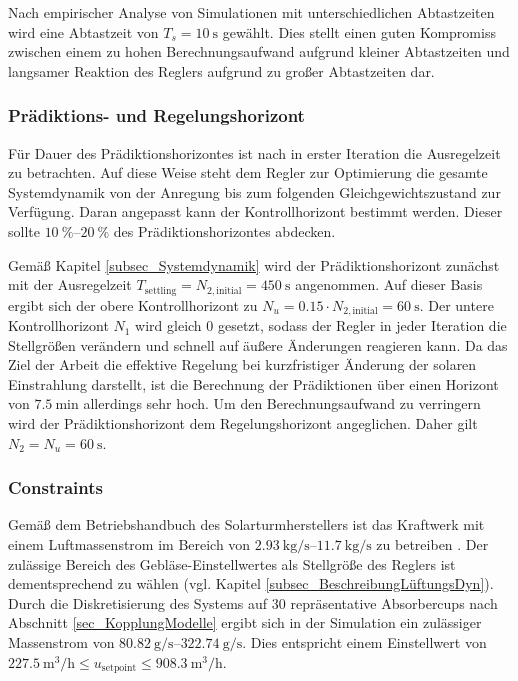 Nach empirischer Analyse von Simulationen mit unterschiedlichen Abtastzeiten wird eine Abtastzeit von $T_s=\SI{10}{\second}$ gewählt.
Dies stellt einen guten Kompromiss zwischen einem zu hohen Berechnungsaufwand aufgrund kleiner Abtastzeiten und langsamer Reaktion des Reglers aufgrund zu großer Abtastzeiten dar.


\subsubsection*{Prädiktions- und Regelungshorizont} \label{subsubsec_horizonte}
Für Dauer des Prädiktionshorizontes ist nach \cite{Bemporad} in erster Iteration die Ausregelzeit zu betrachten.
Auf diese Weise steht dem Regler zur Optimierung die gesamte Systemdynamik von der Anregung bis zum folgenden Gleichgewichtszustand zur Verfügung.
Daran angepasst kann der Kontrollhorizont bestimmt werden.
Dieser sollte $\SIrange{10}{20}{\percent}$ des Prädiktionshorizontes abdecken.

Gemäß Kapitel \ref{subsec_Systemdynamik} wird der Prädiktionshorizont zunächst mit der Ausregelzeit $T_{\mathrm{settling}} = N_{2,\mathrm{initial}} = \SI{450}{\second}$ angenommen.
Auf dieser Basis ergibt sich der obere Kontrollhorizont zu $N_u = 0.15\cdot N_{2,\mathrm{initial}} = \SI{60}{\second}$.
Der untere Kontrollhorizont $N_1$ wird gleich $0$ gesetzt, sodass der Regler in jeder Iteration die Stellgrößen verändern und schnell auf äußere Änderungen reagieren kann.
Da das Ziel der Arbeit die effektive Regelung bei kurzfristiger Änderung der solaren Einstrahlung darstellt, ist die Berechnung der Prädiktionen über einen Horizont von $\SI{7.5}{\minute}$ allerdings sehr hoch.
Um den Berechnungsaufwand zu verringern wird der Prädiktionshorizont dem Regelungshorizont angeglichen.
Daher gilt $N_2 = N_u = \SI{60}{\second}$.

\subsubsection*{Constraints} \label{subsubsec_constraints}
Gemäß dem Betriebshandbuch des Solarturmherstellers ist das Kraftwerk mit einem Luftmassenstrom im Bereich von $\SIrange{2.93}{11.7}{\kilo\gram\per\second}$ zu betreiben \cite[S.28]{HandbuchJülich}.
Der zulässige Bereich des Gebläse-Einstellwertes als Stellgröße des Reglers ist dementsprechend zu wählen (vgl. Kapitel \ref{subsec_BeschreibungLüftungsDyn}).
Durch die Diskretisierung des Systems auf 30 repräsentative Absorbercups nach Abschnitt \ref{sec_KopplungModelle} ergibt sich in der Simulation ein zulässiger Massenstrom von $\SIrange{80.82}{322.74}{\gram\per\second}$.
Dies entspricht einem Einstellwert von $\SI{227.5}{\metre\cubed\per\hour} \leq u_{\mathrm{setpoint}} \leq \SI{908.3}{\metre\cubed\per\hour}$.

